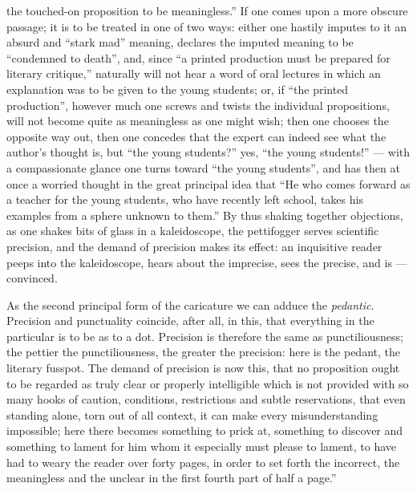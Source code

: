 \documentclass[12pt,a4paper,openany]{book}
\newcommand{\opage}[1]{\marginnote{\footnotesize\textit{[#1]}}}
\begin{document}
the touched-on proposition to be meaningless.'' If one comes upon
a more obscure passage; it is to be treated in one of two
ways: either one hastily imputes to it an absurd and
``stark mad'' meaning, declares the imputed meaning to be
``condemned to death'', and, since ``a printed production must
be prepared for literary critique,'' naturally will not hear a
word of oral lectures in which an explanation was to be
given to the young students; or, if ``the printed production'', however much one screws and twists the individual
propositions, will not become quite as meaningless as one
might wish; then one chooses the opposite way out, then one concedes that the expert can indeed see what the
author's thought is, but ``the young students?'' yes, ``the
young students!'' --- with a compassionate glance one turns
toward ``the young students'', and has then at once a worried
\opage{6}\setcounter{footnote}{0}%
thought in the great principal idea that ``He who comes forward as
a teacher for the young students, who have recently left
school, takes his examples from a sphere unknown to them.''
By thus shaking together objections, as one shakes
bits of glass in a kaleidoscope, the pettifogger serves scientific precision, and the demand of precision makes its
effect: an inquisitive reader peeps into the kaleidoscope, hears
about the imprecise, sees the precise, and is --- convinced.

As the second principal form of the caricature we can adduce the \emph{pedantic}. Precision and punctuality
coincide, after all, in this, that everything in the particular is to be as to
a dot. Precision is therefore the same as punctiliousness; the pettier the punctiliousness, the greater the precision:
here is the pedant, the literary fusspot. The demand of precision is now this, that no proposition ought to be regarded as
truly clear or properly intelligible which is not provided with
so many hooks of caution, conditions, restrictions
and subtle reservations, that even standing alone, torn out
of all context, it can make every misunderstanding impossible; here there becomes something to prick at, something to discover and
something to lament for him whom it especially must please to
lament, to have had to weary the reader over forty pages, in order to set forth the incorrect, the meaningless and
the unclear in the first fourth part of half a page.''
\end{document}
